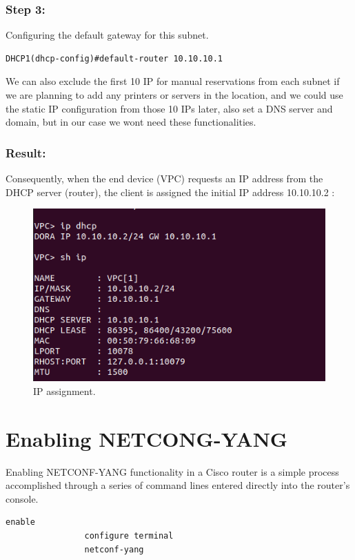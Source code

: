 \subsubsection{Step 3:}
Configuring the default gateway for this subnet.
\begin{lstlisting}[style=cliStyle,  backgroundcolor=\color{codebackground}]
                DHCP1(dhcp-config)#default-router 10.10.10.1
\end{lstlisting}

We can also exclude the first 10 IP for manual reservations from each subnet if we are planning to add any printers or servers in the location, and we could use the static IP configuration from those 10 IPs later, also set a DNS server and domain, but in our case we wont need these functionalities.


\subsubsection{Result:}
Consequently, when the end device (VPC) requests an IP address from the DHCP server (router), the client is assigned the initial IP address 10.10.10.2 :
\begin{figure}[h]
    \centering
    \includegraphics[width=0.7\linewidth]{Images/VPC_dhcp.png}
    \caption{IP assignment.}
\end{figure}

\section{Enabling NETCONG-YANG}

Enabling NETCONF-YANG functionality in a Cisco router is a simple process accomplished through a series of command lines entered directly into the router's console.

\begin{lstlisting}[style=cliStyle,  backgroundcolor=\color{codebackground}]
                enable 
                configure terminal
                netconf-yang
\end{lstlisting}

